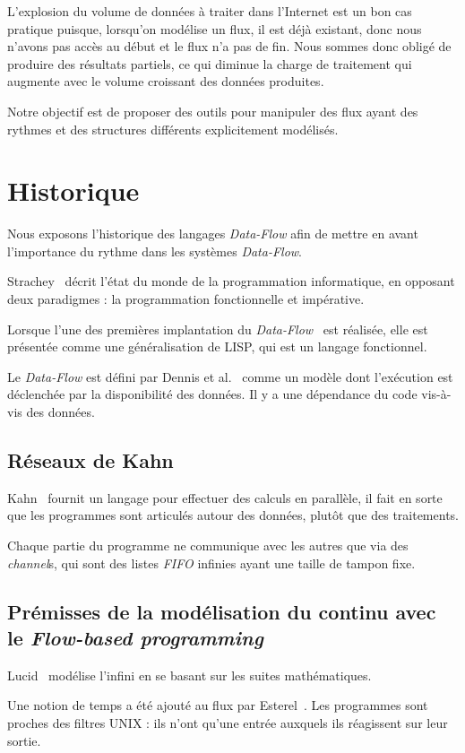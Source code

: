 \documentclass{llncs}
\newcommand{\DF}{\emph{Data-Flow} }
\newcommand{\DFc}{\emph{Data-Flow}}
\newcommand{\DFp}{\emph{Data-Flow}. }
\newcommand{\FB}{\emph{Flow-based programming} }
\begin{document}
L'explosion du volume de données à traiter dans l'Internet est un bon cas pratique
puisque, lorsqu'on modélise un flux, il est déjà existant, donc nous n'avons pas
accès au début et le flux n'a pas de fin. Nous sommes donc obligé de produire
des résultats partiels, ce qui diminue la charge de traitement qui augmente
avec le volume croissant des données produites.

Notre objectif est de proposer des outils pour manipuler des flux ayant des
rythmes et des structures différents explicitement modélisés.

\section{Historique}
Nous exposons l'historique des langages \DF afin
de mettre en avant l'importance du rythme dans les systèmes \DFp

Strachey~\cite{Strachey73} décrit l'état du monde de la programmation
informatique, en opposant deux paradigmes : la programmation fonctionnelle et impérative.

Lorsque l'une des premières implantation du \DFc~\cite{Dennis72} est réalisée, elle
est présentée comme une généralisation de LISP, qui est un langage fonctionnel.

Le \DF est défini par Dennis et al.~\cite{Dennis72} comme un modèle dont l'exécution
est déclenchée par la disponibilité des données.
Il y a une dépendance du code vis-à-vis des données.

\subsection{Réseaux de Kahn}
Kahn~\cite{Kahn74} fournit un langage pour effectuer des calculs en parallèle,
il fait en sorte que les programmes sont articulés autour des données, plutôt que
des traitements.

Chaque partie du programme ne communique avec les autres que via des
\emph{channel}s, qui sont des listes \emph{FIFO} infinies ayant une taille de
tampon fixe.

\subsection{Prémisses de la modélisation du continu avec le \FB}
Lucid~\cite{AshcroftW76} modélise l'infini en se basant sur les suites mathématiques.

Une notion de temps a été ajouté au flux par Esterel~\cite{Berry84}.
Les programmes sont proches des filtres UNIX : ils n'ont qu'une entrée auxquels
ils réagissent sur leur sortie.
\end{document}
